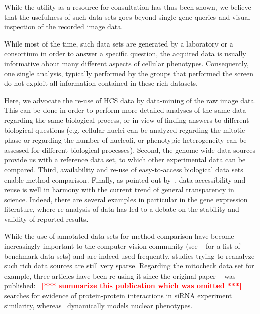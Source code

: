 While the utility as a resource for consultation has thus been shown, we
believe that the usefulness of such data sets goes beyond single gene
queries and visual inspection of the recorded image data. 

While most of the time, such data sets are generated  by a laboratory
or a consortium in order to answer a specific question, the acquired
data is usually informative about many different aspects of cellular
phenotypes. Consequently, one single analysis, typically performed by
the groups that performed the screen do not exploit all information
contained in these rich datasets. 



Here, we advocate the re-use of HCS data by data-mining of the raw
image data. This can be done in order to perform more detailed
analyses of the same data regarding the same biological process, or in
view of finding answers to different biological questions
(e.g. cellular nuclei can be analyzed regarding the mitotic phase or
regarding the number of nucleoli, or phenotypic heterogeneity can be
assessed for different biological processes). Second, the
genome-wide data sources provide us with a reference data set, to
which other experimental data can be compared. 
Third, availability and re-use
of easy-to-access biological data sets enable method
comparison. Finally, as pointed out by~\cite{pmid24904347}, data
accessibility and reuse is well
in harmony with the current trend of general transparency in
science. Indeed, there are several examples in particular in the gene expression
literature, where re-analysis of data
has led to a debate on the stability and validity of reported
results. 

While the use of annotated data sets for method comparison have become
increasingly important to the computer vision community
(see ~\cite{pmid24904347} for a list of benchmark data sets) and are
indeed used frequently, studies trying to reanalyze such rich
data sources are still very sparse. Regarding the mitocheck data set
for example, three articles have
been re-using it since the original paper ~\cite{pmid20360735} was
published:~\cite{ostaszewski2012evolutionary} \textcolor{red}{\bf [***
  summarize this publication which was omitted ***]}
~\cite{pmid25255318} searches for evidence of
protein-protein interactions in siRNA experiment similarity,
whereas~\cite{pmid24131777} dynamically models nuclear phenotypes. 


